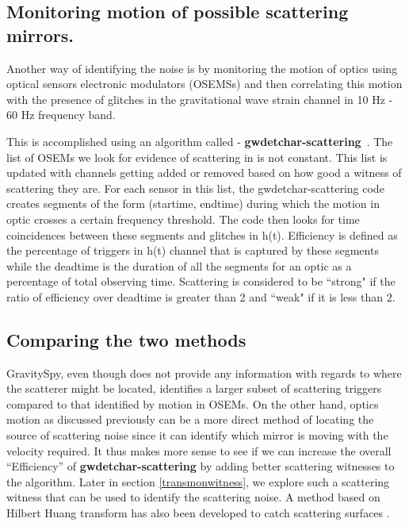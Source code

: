 \documentclass[12pt]{iopart}
\begin{document}
\subsection{Monitoring motion of possible scattering mirrors.}\label{osems}
Another way of identifying the noise is by monitoring the motion of optics using optical sensors electronic modulators (OSEMSs) and then correlating this motion with the presence of glitches in the gravitational wave strain channel in 10 Hz - 60 Hz frequency band.

This is accomplished using an algorithm called - \textbf{gwdetchar-scattering}~\cite{alex_l_urban_2019_3526829}. The list of OSEMs we look for evidence of scattering in is not constant. This list is updated with channels getting added or removed based on how good a witness of scattering they are. For each sensor in this list, the gwdetchar-scattering code creates segments of the form (startime, endtime) during which the motion in optic crosses a certain frequency threshold.  The code then looks for time coincidences between these segments and glitches in h(t). Efficiency is defined as the percentage of triggers in h(t) channel that is captured by these segments while the deadtime is the duration of all the segments for an optic as a percentage of total observing time. Scattering is considered to be ``strong" if the ratio of efficiency over deadtime is greater than 2 and ``weak" if it is less than 2. 

\subsection{Comparing the two methods}
GravitySpy, even though does not provide any information with regards to where the scatterer might be located, identifies a larger subset of scattering triggers compared to that identified by motion in OSEMs. On the other hand, optics motion as discussed previously can be a more direct method of locating the source of scattering noise since it can identify which mirror is moving with the velocity required. It thus makes more sense to see if we can increase the overall ``Efficiency'' of \textbf{gwdetchar-scattering} by adding better scattering witnesses to the algorithm. Later in section \ref{transmonwitness}, we explore such a scattering witness that can be used to identify the scattering noise. A method based on Hilbert Huang transform has also been developed to catch scattering surfaces \cite{hhtransform}. 

\quad
\end{document}
